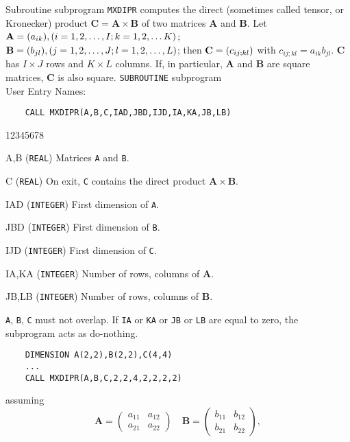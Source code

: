                            
                       
\Submitter{}                              
Subroutine subprogram {\tt MXDIPR} computes the direct (sometimes
called tensor, or Kronecker) product $\mathbf{C=A \times B}$ of
two matrices {\bf A} and {\bf B}. Let ${\bf A}=(a_{ik}),
(i=1,2,\ldots,I; k=1,2,\ldots K)$; ${\bf B}=(b_{jl}),(j=1,2,\ldots,J;
l=1,2,\ldots,L)$; then ${\bf C} = (c_{ij;kl})$ with
$c_{ij;kl}=a_{ik}b_{jl}$. {\bf C} has $I \times J$ rows and
$K \times L$ columns. If, in particular, {\bf A} and {\bf B} are square
matrices, {\bf C} is also square.
\Structure
{\tt SUBROUTINE} subprogram \\
User Entry Names: 
\Usage
\begin{verbatim}
    CALL MXDIPR(A,B,C,IAD,JBD,IJD,IA,KA,JB,LB)
\end{verbatim}
\begin{DLtt}{12345678}
\item [A,B] ({\tt REAL}) Matrices {\tt A} and {\tt B}.
\item [C] ({\tt REAL}) On exit, {\tt C} contains the direct product
$\mathbf{A \times B}$.
\item [IAD] ({\tt INTEGER}) First dimension  of {\tt A}.
\item [JBD] ({\tt INTEGER}) First dimension  of {\tt B}.
\item [IJD] ({\tt INTEGER}) First dimension  of {\tt C}.
\item [IA,KA] ({\tt INTEGER}) Number of rows, columns of {\bf A}.
\item [JB,LB] ({\tt INTEGER}) Number of rows, columns of {\bf B}.
\end{DLtt}
\Restrict
{\tt A}, {\tt B}, {\tt C} must not overlap.
\Errorh
If {\tt IA} or {\tt KA} or {\tt JB} or {\tt LB} are equal to zero,
the subprogram acts as do-nothing.
\Examples
\begin{verbatim}
    DIMENSION A(2,2),B(2,2),C(4,4)
    ...
    CALL MXDIPR(A,B,C,2,2,4,2,2,2,2)
\end{verbatim}
assuming
$$\mathbf{A}=\left(\begin{array}{ll}
a_{11} & a_{12} \\ a_{21}& a_{22} \end{array}\right)\quad
\mathbf{B}=\left(\begin{array}{ll}
b_{11}& b_{12}\\  b_{21} & b_{22}\end{array}\right),$$
